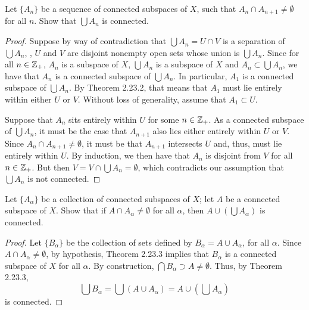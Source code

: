 \begin{exercise}[ID=3.23.2]
  Let $\{A_n\}$ be a sequence of connected subspaces of $X$, such that $A_n \cap A_{n+1} \neq \emptyset$ for all $n$.
  Show that $\bigcup A_n$ is connected.
\end{exercise}
%
\begin{solution}
  \begin{proof}
    Suppose by way of contradiction that $\bigcup A_n = U \cap V$ is a separation of $\bigcup A_n$, \ie, $U$ and $V$ are disjoint nonempty open sets whose union is $\bigcup A_n$.
    Since for all $n \in \mathbb{Z}_+$, $A_n$ is a subspace of $X$, $\bigcup A_n$ is a subspace of $X$ and $A_n \subset \bigcup A_n$, we have that $A_n$ is a connected subspace of $\bigcup A_n$.
    In particular, $A_1$ is a connected subspace of $\bigcup A_n$.
    By Theorem 2.23.2, that means that $A_1$ must lie entirely within either $U$ or $V$.
    Without loss of generality, assume that $A_1 \subset U$.

    Suppose that $A_n$ sits entirely within $U$ for some $n \in \mathbb{Z}_+$.
    As a connected subspace of $\bigcup A_n$, it must be the case that $A_{n+1}$ also lies either entirely within $U$ or $V$.
    Since $A_n \cap A_{n+1} \neq \emptyset$, it must be that $A_{n+1}$ intersects $U$ and, thus, must lie entirely within $U$.
    By induction, we then have that $A_n$ is disjoint from $V$ for all $n \in \mathbb{Z}_+$.
    But then $V = V \cap \bigcup A_n = \emptyset$, which contradicts our assumption that $\bigcup A_n$ is not connected.
  \end{proof}
\end{solution}
\newpage

\begin{exercise}[ID=3.23.3]
  Let $\{A_\alpha\}$ be a collection of connected subspaces of $X$;
  let $A$ be a connected subspace of $X$.
  Show that if $A \cap A_\alpha \neq \emptyset$ for all $\alpha$, then $A \cup \left(\bigcup A_\alpha\right)$ is connected.
\end{exercise}
%
\begin{solution}
  \begin{proof}
    Let $\{B_\alpha\}$ be the collection of sets defined by $B_\alpha = A \cup A_\alpha$, for all $\alpha$.
    Since $A \cap A_\alpha \neq \emptyset$, by hypothesis, Theorem 2.23.3 implies that $B_\alpha$ is a connected subspace of $X$ for all $\alpha$.
    By construction, $\bigcap B_\alpha \supset A \neq \emptyset$.
    Thus, by Theorem 2.23.3,
    \begin{equation*}
      \bigcup B_\alpha = \bigcup \left(A \cup A_\alpha\right) = A \cup \left(\bigcup A_\alpha\right)
    \end{equation*}
    is connected.
  \end{proof}
\end{solution}
\newpage

